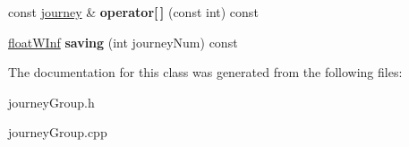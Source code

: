 \begin{DoxyCompactItemize}
\item 
\hypertarget{classjourneyGroup_aced2b1e7a796a719ce350a200ebf3c7a}{
const \hyperlink{classjourney}{journey} \& {\bfseries operator\mbox{[}$\,$\mbox{]}} (const int) const }
\label{classjourneyGroup_aced2b1e7a796a719ce350a200ebf3c7a}

\item 
\hypertarget{classjourneyGroup_af21be1d763c947b9bf6b1107c9e64407}{
\hyperlink{classfloatWInf}{floatWInf} {\bfseries saving} (int journeyNum) const }
\label{classjourneyGroup_af21be1d763c947b9bf6b1107c9e64407}

\end{DoxyCompactItemize}


The documentation for this class was generated from the following files:\begin{DoxyCompactItemize}
\item 
journeyGroup.h\item 
journeyGroup.cpp\end{DoxyCompactItemize}
